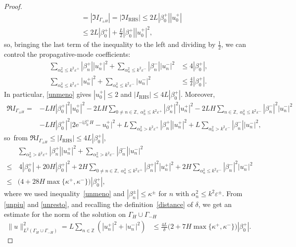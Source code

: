 \documentclass[10pt,a4paper]{amsart}
\newcommand{\IZ}{{\mathbb Z}}
\newcommand{\ri}{{\mathrm i}}
\newcommand{\re}{{\mathrm e}}
\newcommand{\GH}{{\Gamma_H}}
\newcommand{\GmH}{{\Gamma_{-H}}}
\newcommand{\GpmH}{{\Gamma_{\pm H}}}
\begin{document}
\begin{proof}
\begin{align*}
	& =|\Im I_\GpmH|
	=|\Im I_{\mathrm{RHS}}|
	\le 2L |\beta_0^+||u_0^+|\\
	&\le 2L|\beta_0^+|+\frac L2|\beta_0^+||u_0^+|^2,
\end{align*}
so, bringing the last term of the inequality to the left and dividing by $\frac12$, we can control the propagative-mode coefficients:
\begin{align} \label{unmeno}
	\sum_{\alpha_n^2\le k^2\varepsilon^+}|\beta_n^+||u^+_n|^2
	+\sum_{\alpha_n^2\le k^2\varepsilon^-}|\beta_n^-||u^-_n|^2
	&\le 4|\beta_0^+|,
	\\ \label{unpiu}
	\sum_{\alpha_n^2\le k^2\varepsilon^+}|u^+_n|^2
	+\sum_{\alpha_n^2\le k^2\varepsilon^-}|u^-_n|^2
	&\le \frac{4}{\delta}|\beta_0^+|.
\end{align}
In particular, \eqref{unmeno} gives $|u_0^+|\le2$ and $|I_{\mathrm{RHS}}|\le 4L|\beta_0^+|$.
Moreover,
\begin{align}\nonumber
	\Re I_\GpmH
	=&-LH|\beta_0^+|^2 |u^+_0|^2
	-2LH\sum_{0\ne n\in\IZ,\; \alpha_n^2\le k^2\varepsilon^+}|\beta_n^+|^2|u^+_n|^2 
	-2LH\sum_{n\in\IZ,\; \alpha_n^2\le k^2\varepsilon^-}|\beta_n^-|^2|u^-_n|^2  \\
	& - L H|\beta_0^+|^2\big|2\re^{-\ri\beta_0^+ H}-u^{+}_0\big|^2
	+L\sum_{\alpha^2_n > k^2\varepsilon^+} |\beta_n^+||u_n^+|^2
	+L\sum_{\alpha^2_n > k^2\varepsilon^-} |\beta_n^-||u_n^-|^2,
	\label{eq:ReIGamma}
\end{align}
so\, from $\Re I_\GpmH\le |I_{\mathrm{RHS}}| {\le  4L|\beta_0^+|}$,
\begin{align} \nonumber
	&\sum_{\alpha^2_n > k^2\varepsilon^+} |\beta_n^+||u_n^+|^2
	+\sum_{\alpha^2_n > k^2\varepsilon^-} |\beta_n^-||u_n^-|^2
	\\
	\nonumber
	\le	&  \, {4|\beta_0^+|} 
	+20H|\beta_0^+|^2 
	+2H\sum_{0\ne n\in\IZ,\; \alpha_n^2\le k^2\varepsilon^+}|\beta_n^+|^2|u^+_n|^2 
	+2H\sum_{ \alpha_n^2\le k^2\varepsilon^-}|\beta_n^-|^2|u^-_n|^2 
	\\ \label{unresto}
	\le&
	\big(4+28H\max\{\kappa^+,\kappa^-\}\big)|\beta_0^+|,
\end{align}
where we used 
inequality~\eqref{unmeno} and
$|\beta_n^\pm|\le\kappa^\pm$ 
for $n$ with $\alpha_n^2\le k^2\varepsilon^\pm$.
From \eqref{unpiu} and \eqref{unresto}, and recalling the definition~\eqref{distance} of $\delta$, we get an estimate for the norm of the solution on $\GH \cup \GmH$
\begin{align}%
	\|u\|_{L^2(\GH\cup\GmH)}^2= L
	\sum_{n\in\IZ}(|u^+_n|^2+ |u^-_n|^2)
	&\le
	{\frac{4L}\delta\big(2+7 H\max\{\kappa^+,\kappa^-\}\big)|\beta_0^+|. }

\end{align}
\end{proof}
\end{document}
